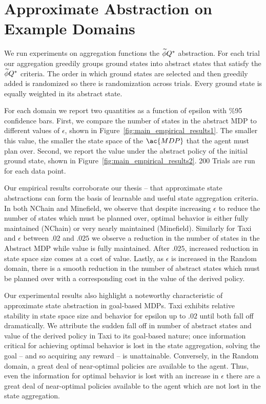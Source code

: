\section{Approximate Abstraction on Example Domains}
We run experiments on aggregation functions the $\widetilde \phi{Q^*}$ abstraction. For each trial our aggregation greedily groups ground states into abstract states that satisfy the $\widetilde \phi{Q^*}$ criteria. The order in which ground states are selected and then greedily added is randomized so there is randomization across trials. Every ground state is equally weighted in its abstract state.

For each domain we report two quantities as a function of epsilon with \%95 confidence bars. First, we compare the number of states in the abstract \ac{MDP} to different values of $\epsilon$, shown in Figure~\ref{fig:main_empirical_results1}. The smaller this value, the smaller the state space of the $\ac{MDP}$ that the agent must plan over. Second, we report the value under the abstract policy of the initial ground state, shown in Figure~\ref{fig:main_empirical_results2}. 200 Trials are run for each data point.

Our empirical results corroborate our thesis -- that approximate state abstractions can form the basis of learnable and useful state aggregation criteria. In both NChain and Minefield, we observe that despite increasing $\epsilon$ to reduce the number of states which must be planned over, optimal behavior is either fully maintained (NChain) or very nearly maintained (Minefield). Similarly for Taxi and $\epsilon$ between $.02$ and $.025$ we observe a reduction in the number of states in the Abstract MDP while value is fully maintained. After $.025$, increased reduction in state space size comes at a cost of value. Lastly, as $\epsilon$ is increased in the Random domain, there is a smooth reduction in the number of abstract states which must be planned over with a corresponding cost in the value of the derived policy.

Our experimental results also highlight a noteworthy characteristic of approximate state abstraction in goal-based \acp{MDP}. Taxi exhibits relative stability in state space size and behavior for epsilon up to $.02$ until both fall off dramatically. We attribute the sudden fall off in number of abstract states and value of the derived policy in Taxi to its goal-based nature; once information critical for achieving optimal behavior is lost in the state aggregation, solving the goal -- and so acquiring any reward -- is unattainable. Conversely, in the Random domain, a great deal of near-optimal policies are available to the agent. Thus, even the information for optimal behavior is lost with an increase in $\epsilon$ there are a great deal of near-optimal policies available to the agent which are not lost in the state aggregation.

